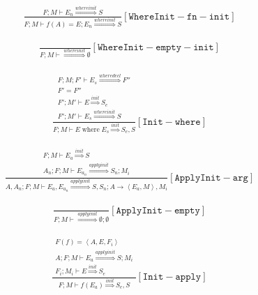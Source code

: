 \documentclass{scrartcl}
\DeclareMathOperator{\where}{where}
\begin{document}
    \begin{align*}
    \frac{
        F; M \vdash E_n \overset{whereinit}{\Rightarrow} S
    }{
        F; M \vdash f(A) = E; E_n \overset{whereinit}{\Rightarrow} S
    }[\mathtt{WhereInit-fn-init}]
    \end{align*}
    
    \begin{align*}
    \frac{}{
        F; M \vdash \overset{whereinit}{\Rightarrow} \emptyset
    }[\mathtt{WhereInit-empty-init}]
    \end{align*}
    
    \begin{align*}
    \frac{
        \begin{matrix}
        F; M; F' \vdash E_s \overset{wheredecl}{\Rightarrow} F'' \\
        F' = F'' \\
        F'; M' \vdash E \overset{init}{\Rightarrow} S_e \\
        F'; M' \vdash E_s \overset{whereinit}{\Rightarrow} S
        \end{matrix}
    }{
        F; M \vdash E \where E_s \overset{init}{\Rightarrow} S_e, S
    }[\mathtt{Init-where}]
    \end{align*}
    
    \begin{align*}
    \frac{
        \begin{matrix}
        F; M \vdash E_a \overset{init}{\Rightarrow} S \\
        A_n; F; M \vdash E_{a_n} \overset{applyinit}{\Rightarrow} S_n; M_i
        \end{matrix}
    }{
        A, A_n; F; M \vdash E_a, E_{a_n} \overset{applyinit}{\Rightarrow} S, S_n; A \to \left< E_a, M \right>, M_i
    }[\mathtt{ApplyInit-arg}]
    \end{align*}
    
    \begin{align*}
    \frac{}{
        F; M \vdash \overset{applyinit}{\Rightarrow} \emptyset; \emptyset
    }[\mathtt{ApplyInit-empty}]
    \end{align*}
    
    \begin{align*}
    \frac{
        \begin{matrix}
        F(f) = \left< A, E, F_i \right> \\
        A; F; M \vdash E_a \overset{applyinit}{\Rightarrow} S; M_i \\
        F_i; M_i \vdash E \overset{init}{\Rightarrow} S_e
        \end{matrix}
    }{
        F; M \vdash f(E_a) \overset{init}{\Rightarrow} S_e, S
    }[\mathtt{Init-apply}]
    \end{align*}
    
\end{document}
